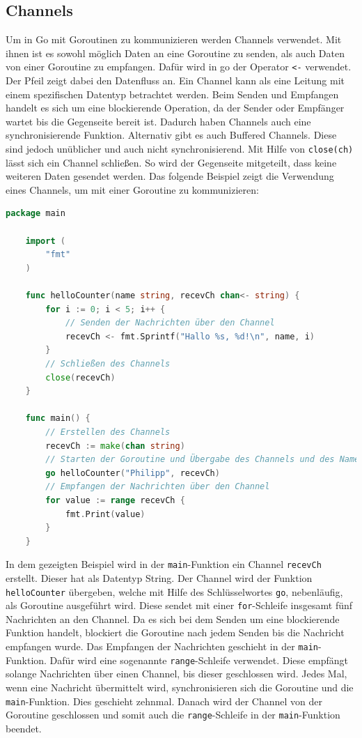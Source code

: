 \documentclass[fontsize=12pt,paper=a4,twoside=semi,parskip=half-,headsepline,headinclude]{scrreprt}
\begin{document}
\subsection{Channels}
\label{subsec:channel}

Um in Go mit Goroutinen zu kommunizieren werden Channels\cite{donovan2015} verwendet. Mit ihnen ist es sowohl möglich Daten an eine Goroutine zu senden, als auch Daten von einer Goroutine zu empfangen. Dafür wird in go der Operator \texttt{<-} verwendet. Der Pfeil zeigt dabei den Datenfluss an. Ein Channel kann als eine Leitung mit einem spezifischen Datentyp betrachtet werden. Beim Senden und Empfangen handelt es sich um eine blockierende Operation, da der Sender oder Empfänger wartet bis die Gegenseite bereit ist. Dadurch haben Channels auch eine synchronisierende Funktion. Alternativ gibt es auch Buffered Channels. Diese sind jedoch unüblicher und auch nicht synchronisierend. Mit Hilfe von \texttt{close(ch)} lässt sich ein Channel schließen. So wird der Gegenseite mitgeteilt, dass keine weiteren Daten gesendet werden. Das folgende Beispiel zeigt die Verwendung eines Channels, um mit einer Goroutine zu kommunizieren:

\begin{lstlisting}[language=Go,extendedchars=true]
	package main

	import (
		"fmt"
	)

	func helloCounter(name string, recevCh chan<- string) {
		for i := 0; i < 5; i++ {
			// Senden der Nachrichten über den Channel
			recevCh <- fmt.Sprintf("Hallo %s, %d!\n", name, i)
		}
		// Schließen des Channels
		close(recevCh)
	}

	func main() {
		// Erstellen des Channels
		recevCh := make(chan string)
		// Starten der Goroutine und Übergabe des Channels und des Namens
		go helloCounter("Philipp", recevCh)
		// Empfangen der Nachrichten über den Channel
		for value := range recevCh {
			fmt.Print(value)
		}
	}
\end{lstlisting}

In dem gezeigten Beispiel wird in der \texttt{main}-Funktion ein Channel \texttt{recevCh} erstellt. Dieser hat als Datentyp String. Der Channel wird der Funktion \texttt{helloCounter} übergeben, welche mit Hilfe des Schlüsselwortes \texttt{go}, nebenläufig, als Goroutine ausgeführt wird. Diese sendet mit einer \texttt{for}-Schleife insgesamt fünf Nachrichten an den Channel. Da es sich bei dem Senden um eine blockierende Funktion handelt, blockiert die Goroutine nach jedem Senden bis die Nachricht empfangen wurde. Das Empfangen der Nachrichten geschieht in der \texttt{main}-Funktion. Dafür wird eine sogenannte \texttt{range}-Schleife verwendet. Diese empfängt solange Nachrichten über einen Channel, bis dieser geschlossen wird.  Jedes Mal, wenn eine Nachricht übermittelt wird, synchronisieren sich die Goroutine und die \texttt{main}-Funktion. Dies geschieht zehnmal. Danach wird der Channel von der Goroutine geschlossen und somit auch die \texttt{range}-Schleife in der \texttt{main}-Funktion beendet.
\end{document}
